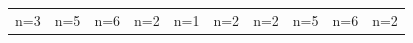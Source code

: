 \documentclass[letterpaper]{article} %
\begin{document}
\begin{figure}[!htbp]
\centering
\footnotesize
\begin{tabular}{cccccccccc}
\multicolumn{1}{c}{n=3} \hspace{-11pt} &
\multicolumn{1}{c}{n=5} \hspace{-11pt} &
\multicolumn{1}{c}{n=6} \hspace{-11pt} &
\multicolumn{1}{c}{n=2} \hspace{-11pt} &
\multicolumn{1}{c}{n=1} \hspace{-11pt} &
\multicolumn{1}{c}{n=2} \hspace{-11pt} &
\multicolumn{1}{c}{n=2} \hspace{-11pt} &
\multicolumn{1}{c}{n=5} \hspace{-11pt} &
\multicolumn{1}{c}{n=6} \hspace{-11pt} &
\multicolumn{1}{c}{n=2} \\


\end{tabular}
\end{figure}
\end{document}

